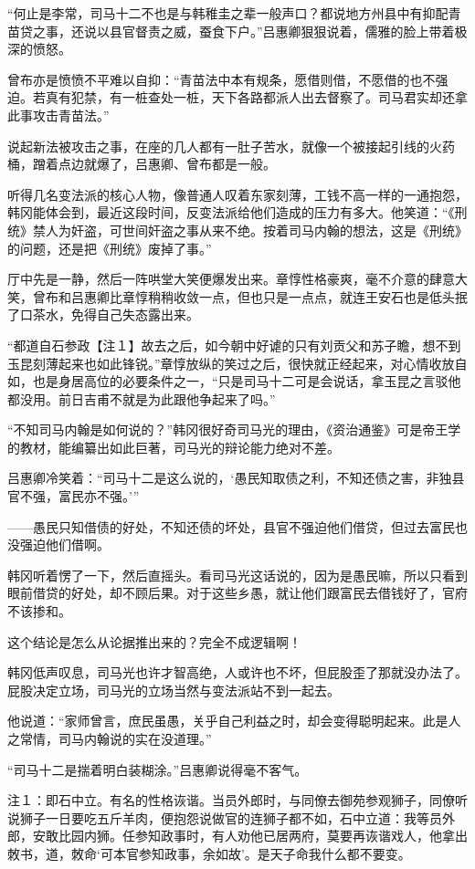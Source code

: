 “何止是李常，司马十二不也是与韩稚圭之辈一般声口？都说地方州县中有抑配青苗贷之事，还说以县官督责之威，蚕食下户。”吕惠卿狠狠说着，儒雅的脸上带着极深的愤怒。

曾布亦是愤愤不平难以自抑：“青苗法中本有规条，愿借则借，不愿借的也不强迫。若真有犯禁，有一桩查处一桩，天下各路都派人出去督察了。司马君实却还拿此事攻击青苗法。”

说起新法被攻击之事，在座的几人都有一肚子苦水，就像一个被接起引线的火药桶，蹭着点边就爆了，吕惠卿、曾布都是一般。

听得几名变法派的核心人物，像普通人叹着东家刻薄，工钱不高一样的一通抱怨，韩冈能体会到，最近这段时间，反变法派给他们造成的压力有多大。他笑道：“《刑统》禁人为奸盗，可世间奸盗之事从来不绝。按着司马内翰的想法，这是《刑统》的问题，还是把《刑统》废掉了事。”

厅中先是一静，然后一阵哄堂大笑便爆发出来。章惇性格豪爽，毫不介意的肆意大笑，曾布和吕惠卿比章惇稍稍收敛一点，但也只是一点点，就连王安石也是低头抿了口茶水，免得自己失态露出来。

“都道自石参政【注１】故去之后，如今朝中好谑的只有刘贡父和苏子瞻，想不到玉昆刻薄起来也如此锋锐。”章惇放纵的笑过之后，很快就正经起来，对心情收放自如，也是身居高位的必要条件之一，“只是司马十二可是会说话，拿玉昆之言驳他都没用。前日吉甫不就是为此跟他争起来了吗。”

“不知司马内翰是如何说的？”韩冈很好奇司马光的理由，《资治通鉴》可是帝王学的教材，能编纂出如此巨著，司马光的辩论能力绝对不差。

吕惠卿冷笑着：“司马十二是这么说的，‘愚民知取债之利，不知还债之害，非独县官不强，富民亦不强。’”

——愚民只知借债的好处，不知还债的坏处，县官不强迫他们借贷，但过去富民也没强迫他们借啊。

韩冈听着愣了一下，然后直摇头。看司马光这话说的，因为是愚民嘛，所以只看到眼前借贷的好处，却不顾后果。对于这些乡愚，就让他们跟富民去借钱好了，官府不该掺和。

这个结论是怎么从论据推出来的？完全不成逻辑啊！

韩冈低声叹息，司马光也许才智高绝，人或许也不坏，但屁股歪了那就没办法了。屁股决定立场，司马光的立场当然与变法派站不到一起去。

他说道：“家师曾言，庶民虽愚，关乎自己利益之时，却会变得聪明起来。此是人之常情，司马内翰说的实在没道理。”

“司马十二是揣着明白装糊涂。”吕惠卿说得毫不客气。

注１：即石中立。有名的性格诙谐。当员外郎时，与同僚去御苑参观狮子，同僚听说狮子一日要吃五斤羊肉，便抱怨说做官的连狮子都不如，石中立道：我等员外郎，安敢比园内狮。任参知政事时，有人劝他已居两府，莫要再诙谐戏人，他拿出敇书，道，敇命‘可本官参知政事，余如故’。是天子命我什么都不要变。

